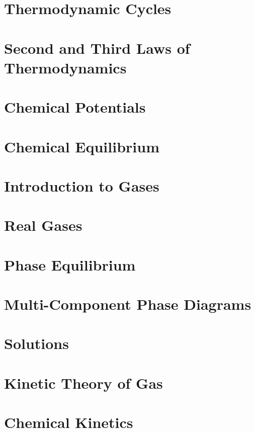 \documentclass[
]{book}
\theoremstyle{definition}
\theoremstyle{definition}
\theoremstyle{definition}
\theoremstyle{remark}
\begin{document}
\hypertarget{ThermodynamicCycles}{%
\chapter{Thermodynamic Cycles}\label{ThermodynamicCycles}}

\hypertarget{SecondThirdLaws}{%
\chapter{Second and Third Laws of Thermodynamics}\label{SecondThirdLaws}}

\hypertarget{Potentials}{%
\chapter{Chemical Potentials}\label{Potentials}}

\hypertarget{ChemicalEquilibrium}{%
\chapter{Chemical Equilibrium}\label{ChemicalEquilibrium}}

\hypertarget{Gases}{%
\chapter{Introduction to Gases}\label{Gases}}

\hypertarget{RealGases}{%
\chapter{Real Gases}\label{RealGases}}

\hypertarget{PhaseEquilibrium}{%
\chapter{Phase Equilibrium}\label{PhaseEquilibrium}}

\hypertarget{MCPhaseDiagrams}{%
\chapter{Multi-Component Phase Diagrams}\label{MCPhaseDiagrams}}

\hypertarget{Solutions}{%
\chapter{Solutions}\label{Solutions}}

\hypertarget{KTG}{%
\chapter{Kinetic Theory of Gas}\label{KTG}}

\hypertarget{Kinetics}{%
\chapter{Chemical Kinetics}\label{Kinetics}}

  
\end{document}
